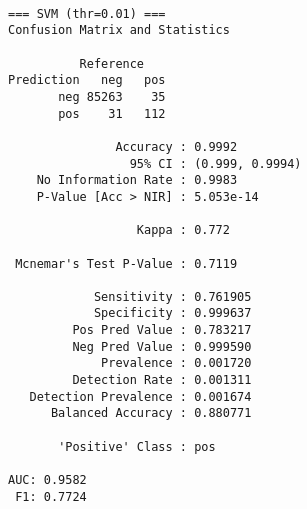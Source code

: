 \documentclass[
  11pt,
  letterpaper,
  DIV=11,
  numbers=noendperiod]{scrartcl}
\newenvironment{Shaded}{}{}
\newcommand{\AttributeTok}[1]{\textcolor[rgb]{0.84,0.23,0.29}{#1}}
\newcommand{\DocumentationTok}[1]{\textcolor[rgb]{0.42,0.45,0.49}{#1}}
\newcommand{\FunctionTok}[1]{\textcolor[rgb]{0.44,0.26,0.76}{#1}}
\newcommand{\NormalTok}[1]{\textcolor[rgb]{0.14,0.16,0.18}{#1}}
\newcommand{\OtherTok}[1]{\textcolor[rgb]{0.44,0.26,0.76}{#1}}
\newcommand{\SpecialCharTok}[1]{\textcolor[rgb]{0.00,0.36,0.77}{#1}}
\newcommand{\StringTok}[1]{\textcolor[rgb]{0.01,0.18,0.38}{#1}}
\begin{document}
\begin{verbatim}

=== SVM (thr=0.01) ===
Confusion Matrix and Statistics

          Reference
Prediction   neg   pos
       neg 85263    35
       pos    31   112
                                         
               Accuracy : 0.9992         
                 95% CI : (0.999, 0.9994)
    No Information Rate : 0.9983         
    P-Value [Acc > NIR] : 5.053e-14      
                                         
                  Kappa : 0.772          
                                         
 Mcnemar's Test P-Value : 0.7119         
                                         
            Sensitivity : 0.761905       
            Specificity : 0.999637       
         Pos Pred Value : 0.783217       
         Neg Pred Value : 0.999590       
             Prevalence : 0.001720       
         Detection Rate : 0.001311       
   Detection Prevalence : 0.001674       
      Balanced Accuracy : 0.880771       
                                         
       'Positive' Class : pos            
                                         
AUC: 0.9582 
 F1: 0.7724 
\end{verbatim}

\begin{Shaded}
\end{Shaded}
\end{document}

